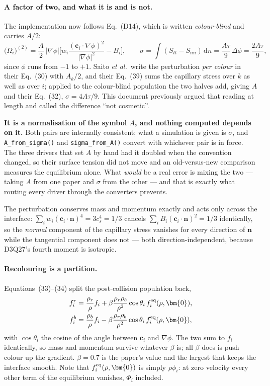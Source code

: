 \documentclass[11pt,a4paper]{article}
\newcommand{\code}[1]{\texttt{\small #1}}
\newcommand{\cs}{c_s}
\newcommand{\ci}{\bm{c}_i}
\newcommand{\nn}{\bm{n}}
\begin{document}
\paragraph{A factor of two, and what it is and is not.} The implementation now
follows Eq.~(D14), which is written \emph{colour-blind} and carries $A/2$:
\begin{equation}
  \big(\Omega_i\big)^{(2)} = \frac{A}{2}\,|\nabla\phi|
      \Big[ w_i \frac{(\ci\cdot\nabla\phi)^2}{|\nabla\phi|^2} - B_i \Big],
  \qquad
  \sigma = \int (S_{tt} - S_{nn})\,\mathrm{d}n = \frac{A\tau}{9}\,\Delta\phi
         = \frac{2A\tau}{9},
\end{equation}
since $\phi$ runs from $-1$ to $+1$. Saito \emph{et al.}\ write the perturbation
\emph{per colour} in their Eq.~(30) with $A_k/2$, and their Eq.~(39) sums the
capillary stress over $k$ as well as over $i$; applied to the colour-blind
population the two halves add, giving $A$ and their Eq.~(32),
$\sigma = 4A\tau/9$. This document previously argued that reading at length and
called the difference ``not cosmetic''.

\textbf{It is a normalisation of the symbol $A$, and nothing computed depends on
it.} Both pairs are internally consistent; what a simulation is given is
$\sigma$, and \code{A\_from\_sigma()} and \code{sigma\_from\_A()} convert with
whichever pair is in force. The three drivers that set $A$ by hand had it doubled
when the convention changed, so their surface tension did not move and an
old-versus-new comparison measures the equilibrium alone. What \emph{would} be a
real error is mixing the two --- taking $A$ from one paper and $\sigma$ from the
other --- and that is exactly what routing every driver through the converters
prevents.

The perturbation conserves mass and momentum exactly and acts only across the
interface: $\sum_i w_i (\ci\cdot\nn)^4 = 3\cs^4 = 1/3$ cancels
$\sum_i B_i (\ci\cdot\nn)^2 = 1/3$ identically, so the \emph{normal} component
of the capillary stress vanishes for every direction of $\nn$ while the
tangential component does not --- both direction-independent, because D3Q27's
fourth moment is isotropic.

\paragraph{Recolouring is a partition.} Equations~(33)--(34) split the
post-collision population back,
\begin{align}
  f_i^r &= \frac{\rho_r}{\rho} f_i
           + \beta \frac{\rho_r \rho_b}{\rho^2}\cos\theta_i\, f_i^{\rm eq}(\rho, \bm{0}), \\
  f_i^b &= \frac{\rho_b}{\rho} f_i
           - \beta \frac{\rho_r \rho_b}{\rho^2}\cos\theta_i\, f_i^{\rm eq}(\rho, \bm{0}),
\end{align}
with $\cos\theta_i$ the cosine of the angle between $\ci$ and $\nabla\phi$. The
two sum to $f_i$ identically, so mass and momentum survive whatever $\beta$ is;
all $\beta$ does is push colour up the gradient. $\beta = 0.7$ is the paper's
value and the largest that keeps the interface smooth. Note that
$f_i^{\rm eq}(\rho, \bm{0})$ is simply $\rho\phi_i$: at zero velocity every
other term of the equilibrium vanishes, $\Phi_i$ included.
\end{document}
